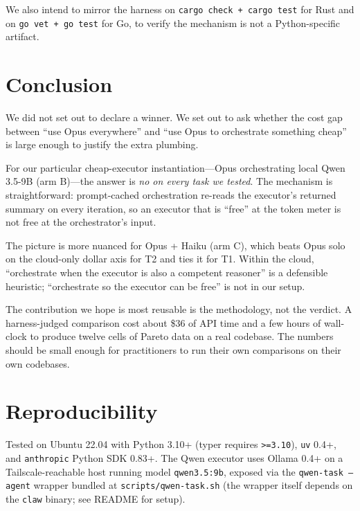 \documentclass[11pt,a4paper]{article}
\begin{document}
We also intend to mirror the harness on \texttt{cargo check + cargo test} for Rust and on \texttt{go vet + go test} for Go, to verify the mechanism is not a Python-specific artifact.

\section{Conclusion}

We did not set out to declare a winner. We set out to ask whether the cost gap between ``use Opus everywhere'' and ``use Opus to orchestrate something cheap'' is large enough to justify the extra plumbing.

For our particular cheap-executor instantiation---Opus orchestrating local Qwen 3.5-9B (arm B)---the answer is \emph{no on every task we tested}. The mechanism is straightforward: prompt-cached orchestration re-reads the executor's returned summary on every iteration, so an executor that is ``free'' at the token meter is not free at the orchestrator's input.

The picture is more nuanced for Opus + Haiku (arm C), which beats Opus solo on the cloud-only dollar axis for T2 and ties it for T1. Within the cloud, ``orchestrate when the executor is also a competent reasoner'' is a defensible heuristic; ``orchestrate so the executor can be free'' is not in our setup.

The contribution we hope is most reusable is the methodology, not the verdict. A harness-judged comparison cost about \$36 of API time and a few hours of wall-clock to produce twelve cells of Pareto data on a real codebase. The numbers should be small enough for practitioners to run their own comparisons on their own codebases.

\section*{Reproducibility}

Tested on Ubuntu 22.04 with Python 3.10+ (typer requires \verb|>=3.10|), \texttt{uv} 0.4+, and \texttt{anthropic} Python SDK 0.83+. The Qwen executor uses Ollama 0.4+ on a Tailscale-reachable host running model \texttt{qwen3.5:9b}, exposed via the \texttt{qwen-task --agent} wrapper bundled at \texttt{scripts/qwen-task.sh} (the wrapper itself depends on the \texttt{claw} binary; see README for setup).
\end{document}
